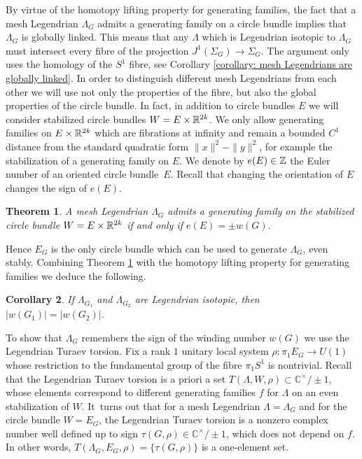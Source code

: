 \documentclass[11pt]{article}
\numberwithin{equation}{section}\providecommand{\dpl}{\displaystyle}
\theoremstyle{plain}
\newtheorem{theorem}{Theorem}[section]
\newtheorem{corollary}[theorem]{Corollary}
\theoremstyle{definition}
\newcommand{\bC}{\mathbb{C}}\newcommand{\bD}{\mathbb{D}}
\begin{document}
By virtue of the homotopy lifting property for generating families, the fact that a mesh Legendrian $\Lambda_G$ admits a generating family on a circle bundle implies that $\Lambda_G$ is globally linked. This means that any $\Lambda$ which is Legendrian isotopic to $\Lambda_G$ must intersect every fibre of the projection $J^1(\Sigma_G) \to \Sigma_G$. The argument only uses the homology of the $S^1$ fibre, see Corollary \ref{corollary: mesh Legendrians are globally linked}. In order to distinguish different mesh Legendrians from each other we will use not only the properties of the fibre, but also the global properties of the circle bundle. In fact, in addition to circle bundles $E$ we will consider stabilized circle bundles $W=E \times \mathbb{R}^{2k}$. We only allow generating families on $E \times \mathbb{R}^{2k}$ which are fibrations at infinity and remain a bounded $C^1$ distance from the standard quadratic form $\|x\|^2-\|y\|^2$, for example the stabilization of a generating family on $E$. We denote by $e(E) \in \mathbb{Z}$ the Euler number of an oriented circle bundle~$E$. Recall that changing the orientation of $E$ changes the sign of $e(E)$.

\begin{theorem}\label{euler} A mesh Legendrian $\Lambda_G$ admits a generating family on the stabilized circle bundle $W=E \times \mathbb{R}^{2k}$ if and only if $e(E)=\pm w(G)$.
\end{theorem}

Hence $E_G$ is the only circle bundle which can be used to generate $\Lambda_G$, even stably. Combining Theorem \ref{euler} with the homotopy lifting property for generating families we deduce the following.

\begin{corollary}\label{reidemeister}
If $\Lambda_{G_1}$ and $\Lambda_{G_2}$ are Legendrian isotopic, then $|w(G_1)|=|w(G_2)|$.
\end{corollary}

To show that $\Lambda_G$ remembers the sign of the winding number $w(G)$ we use the Legendrian Turaev torsion. Fix a rank $1$ unitary local system $\rho: \pi_1 E_G \to U(1)$ whose restriction to the fundamental group of the fibre $\pi_1S^1$ is nontrivial. Recall that the Legendrian Turaev torsion is a priori a set $T(\Lambda, W, \rho) \subset \bC^\times / \pm 1$, whose elements correspond to different generating families $f$ for $\Lambda$ on an even stabilization of $W$. It~turns out that for a mesh Legendrian $\Lambda=\Lambda_G$ and for the circle bundle $W=E_G$, the Legendrian Turaev torsion is a nonzero complex number well defined up to sign $\tau(G, \rho) \in \bC^\times/ \pm 1$, which does not depend on $f$. In other words, $T(\Lambda_G,E_G,\rho)=\{\tau(G,\rho)\}$ is a one-element set.
\end{document}
